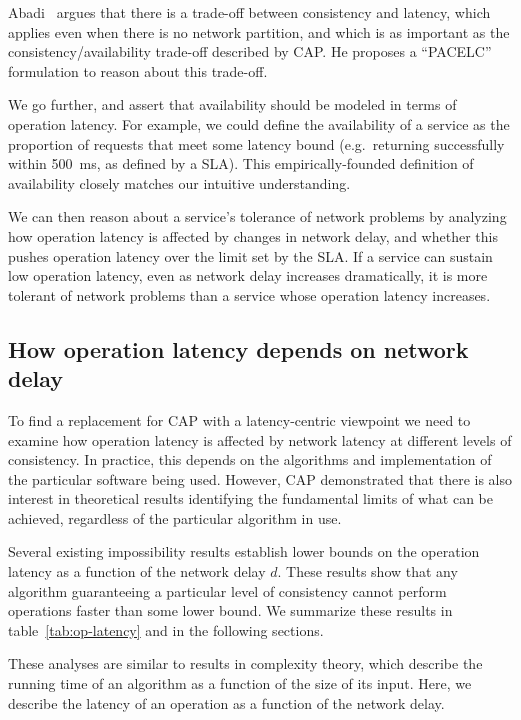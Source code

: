 \documentclass[a4paper,twocolumn,10pt]{article}
\begin{document}
Abadi~\cite{Abadi2012hb} argues that there is a trade-off between consistency and latency, which
applies even when there is no network partition, and which is as important as the
consistency/availability trade-off described by CAP. He proposes a ``PACELC'' formulation to reason
about this trade-off.

We go further, and assert that availability should be modeled in terms of operation latency. For
example, we could define the availability of a service as the proportion of requests that meet some
latency bound (e.g.\ returning successfully within 500~ms, as defined by a SLA). This
empirically-founded definition of availability closely matches our intuitive understanding.

We can then reason about a service's tolerance of network problems by analyzing how operation
latency is affected by changes in network delay, and whether this pushes operation latency over the
limit set by the SLA. If a service can sustain low operation latency, even as network delay
increases dramatically, it is more tolerant of network problems than a service whose operation
latency increases.

\subsection{How operation latency depends on network delay}\label{sec:network-dependence}

To find a replacement for CAP with a latency-centric viewpoint we need to examine how operation
latency is affected by network latency at different levels of consistency. In practice, this depends
on the algorithms and implementation of the particular software being used. However, CAP
demonstrated that there is also interest in theoretical results identifying the fundamental limits
of what can be achieved, regardless of the particular algorithm in use.

Several existing impossibility results establish lower bounds on the operation latency as a function
of the network delay $d$. These results show that any algorithm guaranteeing a particular level of
consistency cannot perform operations faster than some lower bound. We summarize these results in
table~\ref{tab:op-latency} and in the following sections.

These analyses are similar to results in complexity theory, which describe the running time of an
algorithm as a function of the size of its input. Here, we describe the latency of an operation as a
function of the network delay.
\end{document}
